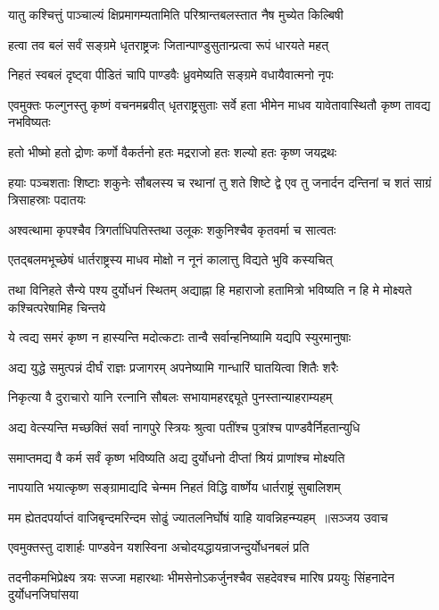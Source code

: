 \twolineshloka
{यातु कश्चित्तुं पाञ्चाल्यं क्षिप्रमागम्यतामिति}
{परिश्रान्तबलस्तात नैष मुच्येत किल्बिषी}


\twolineshloka
{हत्वा तव बलं सर्वं सङ्ग्रमे धृतराष्ट्रजः}
{जितान्पाण्डुसुतान्प्रत्वा रूपं धारयते महत्}


\twolineshloka
{निहतं स्वबलं दृष्ट्वा पीडितं चापि पाण्डवैः}
{ध्रुवमेष्यति सङ्ग्रमे वधायैवात्मनो नृपः}


\threelineshloka
{एवमुक्तः फल्गुनस्तु कृष्णं वचनमब्रवीत्}
{धृतराष्ट्रसुताः सर्वे हता भीमेन माधव}
{यावेतावास्थितौ कृष्ण तावद्य नभविष्यतः}


\twolineshloka
{हतो भीष्मो हतो द्रोणः कर्णो वैकर्तनो हतः}
{मद्रराजो हतः शल्यो हतः कृष्ण जयद्रथः}


\threelineshloka
{हयाः पञ्चशताः शिष्टाः शकुनेः सौबलस्य च}
{रथानां तु शते शिष्टे द्वे एव तु जनार्दन}
{दन्तिनां च शतं साग्रं त्रिसाहस्राः पदातयः}


\twolineshloka
{अश्वत्थामा कृपश्चैव त्रिगर्ताधिपतिस्तथा}
{उलूकः शकुनिश्चैव कृतवर्मा च सात्वतः}


\twolineshloka
{एतद्बलमभूच्छेषं धार्तराष्ट्रस्य माधव}
{मोक्षो न नूनं कालात्तु विद्यते भुवि कस्यचित्}


\threelineshloka
{तथा विनिहते सैन्ये पश्य दुर्योधनं स्थितम्}
{अद्याह्ना हि महाराजो हतामित्रो भविष्यति}
{न हि मे मोक्ष्यते कश्चित्परेषामिह चिन्तये}


\twolineshloka
{ये त्वद्य समरं कृष्ण न हास्यन्ति मदोत्कटाः}
{तान्वै सर्वान्हनिष्यामि यद्यपि स्युरमानुषाः}


\twolineshloka
{अद्य युद्धे समुत्पन्नं दीर्घं राज्ञः प्रजागरम्}
{अपनेष्यामि गान्धारिं घातयित्वा शितैः शरैः}


\twolineshloka
{निकृत्या वै दुराचारो यानि रत्नानि सौबलः}
{सभायामहरद्द्यूते पुनस्तान्याहराम्यहम्}


\twolineshloka
{अद्य वेत्स्यन्ति मच्छक्तिं सर्वा नागपुरे स्त्रियः}
{श्रुत्वा पतींश्च पुत्रांश्च पाण्डवैर्निहतान्युधि}


\twolineshloka
{समाप्तमद्य वै कर्म सर्वं कृष्ण भविष्यति}
{अद्य दुर्योधनो दीप्तां श्रियं प्राणांश्च मोक्ष्यति}


\twolineshloka
{नापयाति भयात्कृष्ण सङ्ग्रामाद्यदि चेन्मम}
{निहतं विद्धि वार्ष्णेय धार्तराष्ट्रं सुबालिशम्}


\threelineshloka
{मम ह्येतदपर्याप्तं वाजिबृन्दमरिन्दम}
{सोढुं ज्यातलनिर्घोषं याहि यावन्निहन्म्यहम् ॥सञ्जय उवाच}
{}


\twolineshloka
{एवमुक्तस्तु दाशार्हः पाण्डवेन यशस्विना}
{अचोदयद्धायन्राजन्दुर्योधनबलं प्रति}


\threelineshloka
{तदनीकमभिप्रेक्ष्य त्रयः सज्जा महारथाः}
{भीमसेनोऽकर्जुनश्चैव सहदेवश्च मारिष}
{प्रययुः सिंहनादेन दुर्योधनजिघांसया}


